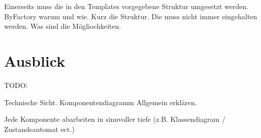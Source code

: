 Einerseits muss die in den Templates vorgegebene Struktur umgesetzt werden.
ByFactory warum und wie.
Kurz die Struktur.
Die muss nicht immer eingehalten werden. Was sind die Mögliochkeiten.



\section{Ausblick}

TODO: 

Technische Sicht. 
Komponentendiagramm Allgemein erklären.

Jede Komponente abarbeiten in sinnvoller tiefe (z.B. Klassendiagram / Zustandsautomat ect.)













